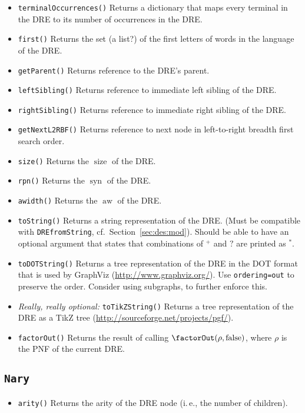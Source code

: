 \documentclass[a4paper,11pt, svgnames,titlepage]{article}
\newcommand{\rxp}{{^\mathtt{+}}}
\newcommand{\rxs}{{^\mathtt{*}}}
\newcommand{\rxo}{\mathtt{?}}
\DeclareMathOperator{\siz}{size}
\DeclareMathOperator{\syn}{syn}
\DeclareMathOperator{\aw}{aw}
\newcommand{\false}{\ensuremath{\operatorname{false}}\xspace}
\begin{document}
\begin{itemize}
	\item\texttt{terminalOccurrences()} Returns a dictionary that maps every terminal in the DRE to its number of occurrences in the DRE.
	\item\texttt{first()} Returns the set (a list?) of the first letters of words in the language of the DRE.
	\item\texttt{getParent()} Returns reference to the DRE's parent.
	\item\texttt{leftSibling()} Returns reference to immediate left sibling of the DRE.
	\item\texttt{rightSibling()} Returns reference to immediate right sibling of the DRE.
	\item\texttt{getNextL2RBF()} Returns reference to next node in left-to-right breadth first search order.
	\item\texttt{size()} Returns the $\siz$ of the DRE.
	\item\texttt{rpn()} Returns the $\syn$ of the DRE.
	\item\texttt{awidth()} Returns the $\aw$ of the DRE.
	\item\texttt{toString()} Returns a string representation of the DRE. (Must be compatible with \texttt{DREfromString}, cf.\ Section~\ref{sec:des:mod}). Should be able to have an optional argument that states that combinations of $\rxp$ and $\rxo$ are printed as $\rxs$.
	\item\texttt{toDOTString()} Returns a tree representation of the DRE in the DOT format that is used by GraphViz (\url{http://www.graphviz.org/}). Use \texttt{ordering=out} to preserve the order. Consider using subgraphs, to further enforce this.
	\item \emph{Really, really optional:} \texttt{toTikZString()} Returns a tree representation of the DRE as a TikZ tree (\url{http://sourceforge.net/projects/pgf/}).
	\item \texttt{factorOut()} Returns the result of calling $\factorOut(\rho,\false)$, where $\rho$ is the PNF of the current DRE.
\end{itemize}
\subsection{\texttt{Nary}}\label{sec:des:nary}
\begin{itemize}
	\item\texttt{arity()} Returns the arity of the DRE node (i.\,e., the number of children).
\end{itemize}
\end{document}
